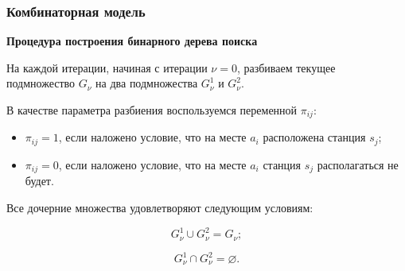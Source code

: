 \begin{frame}
    \frametitle{Комбинаторная модель}
    \justifying
    \begin{minipage}[t]{1\linewidth}
        \fontsize{8pt}{7.2}\selectfont
        \textbf{Процедура построения бинарного дерева поиска} 
        \bigskip

        На каждой итерации, начиная с итерации $\nu=0$, разбиваем текущее подмножество $G_\nu$ на два подмножества $G^1_\nu$ и $G^2_\nu$. 
    \bigskip
    \end{minipage}
    
    \begin{minipage}[b]{0.5\linewidth}
        \fontsize{9pt}{7.2}\selectfont
        В качестве параметра разбиения воспользуемся переменной $\pi_{ij}$:

        \begin{itemize}
            \item $\pi_{ij}=1$, если наложено условие, что на месте $a_i$ расположена станция $s_j$;
            \item $\pi_{ij} = 0$, если наложено условие, что на месте $a_i$ станция $s_j$  располагаться не будет.
        \end{itemize}
        \bigskip
        Все дочерние множества удовлетворяют следующим условиям:

    $$
        G^1_\nu \cup G^2_\nu = G_\nu;
    $$


    $$
        G^1_\nu \cap G^2_\nu = \varnothing.
    $$

    \end{minipage}
    \hfill
    \begin{minipage}[b]{0.47\linewidth}
        
    \end{minipage}
    \hfill
    



\end{frame}

